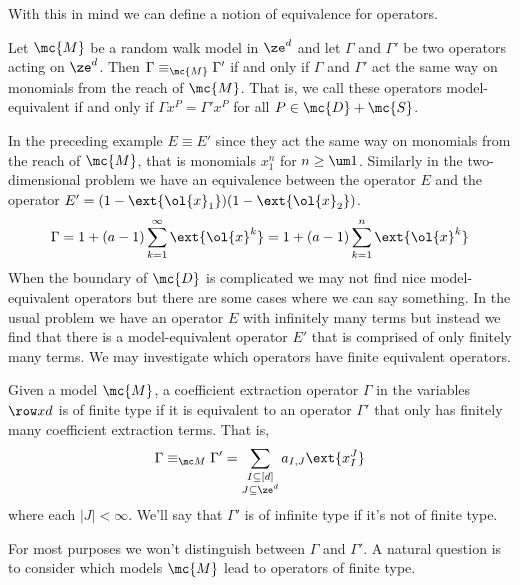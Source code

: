 With this in mind we can define a notion of equivalence for operators.
\begin{definition} Let $\mc{M}$ be a random walk model in $\ze^d$ and let $\Gamma$ and $\Gamma'$ be two operators acting on $\ze^d$. Then $\Gamma \equiv_{\mc{M}} \Gamma'$ if and only if $\Gamma$ and $\Gamma'$ act the same way on monomials from the reach of $\mc{M}$. That is, we call these operators model-equivalent if and only if $\Gamma  x^P = \Gamma' x^P$ for all $P\in \mc{D}+\mc{S}$.
\end{definition}
In the preceding example $E\equiv E'$ since they act the same way on monomials from the reach of $\mc{M}$, that is monomials $x_1^n$ for $n\ge \um 1$. Similarly in the two-dimensional problem we have an equivalence between the operator $E$ and the operator $E' = (1-\ext{\ol{x}_1})(1-\ext{\ol{x}_2})$.
\begin{align}
	\Gamma = 1 + (a-1)\sum_{k=1}^{\infty} \ext{\ol{x}^k} = 1 + (a-1)\sum_{k=1}^{n} \ext{\ol{x}^k}
\end{align}
When the boundary of $\mc{D}$ is complicated we may not find nice model-equivalent operators but there are some cases where we can say something. In the usual problem we have an operator $E$ with infinitely many terms but instead we find that there is a model-equivalent operator $E'$ that is comprised of only finitely many terms. We may investigate which operators have finite equivalent operators.
\begin{definition} Given a model $\mc{M}$, a coefficient extraction operator $\Gamma$ in the variables $\row xd$ is of finite type if it is equivalent to an operator $\Gamma'$ that only has finitely many coefficient extraction terms. That is,
\begin{align}
	\Gamma \equiv_{\mc M} \Gamma' = \sum_{\substack{I\subseteq [d]\\ J \subseteq \ze^d}}a_{I,J} \ext{x_I^J}
\end{align}
where each $|J| < \infty$. We'll say that $\Gamma'$ is of infinite type if it's not of finite type.
\end{definition}
For most purposes we won't distinguish between $\Gamma$ and $\Gamma'$. A natural question is to consider which models $\mc{M}$ lead to operators of finite type.


